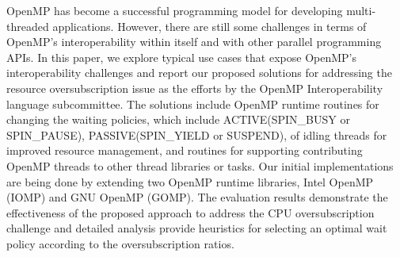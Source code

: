 OpenMP has become a successful programming model
for developing multi-threaded applications.
However, there are still some challenges in terms of OpenMP's interoperability
within itself and with other parallel programming APIs.
In this paper, we explore typical use cases that expose OpenMP's interoperability challenges and
report our proposed solutions for addressing the resource oversubscription issue as the efforts
by the OpenMP Interoperability language subcommittee. 
The solutions include OpenMP runtime routines for
changing the waiting policies, which include ACTIVE(SPIN\_BUSY or SPIN\_PAUSE), 
PASSIVE(SPIN\_YIELD or SUSPEND), 
of idling threads for improved resource management, and 
routines for supporting contributing OpenMP threads to other thread libraries or tasks. 
Our initial implementations are being done by extending two OpenMP runtime libraries, 
Intel OpenMP (IOMP) and GNU OpenMP (GOMP).
The evaluation results demonstrate the effectiveness of the proposed approach to address the CPU 
oversubscription challenge and detailed analysis provide heuristics for selecting an optimal wait policy according
to the oversubscription ratios. 


